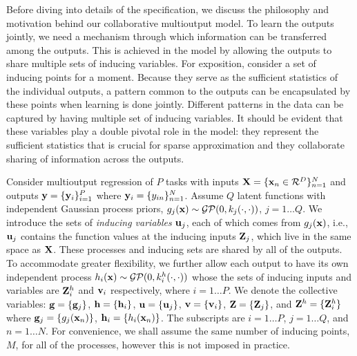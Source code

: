 Before diving into details of the specification, we discuss the philosophy and motivation behind our collaborative multioutput model.
To learn the outputs jointly, we need a mechanism through which information can be transferred among the outputs.
This is achieved in the model by allowing the outputs to share multiple sets of inducing variables.
For exposition, consider a set of inducing points for a moment.
Because they serve as the sufficient statistics of the individual outputs, a pattern common to the outputs can be encapsulated by these points when learning is done jointly. 
Different patterns in the data can be captured by having  multiple set of inducing variables.
It should be evident that these variables play a double pivotal role in the model: they represent the sufficient statistics that is crucial for sparse approximation and they collaborate sharing of information across the outputs.

\newcommand{\Zj}{\Z_j}
\newcommand{\Zhi}{\Z^h_i}
Consider multioutput regression of $P$ tasks with inputs $\mathbf{X} = \{\mathbf{x}_n \in \mathcal{R}^D\}_{n=1}^N$ and outputs $\mathbf{y} = \{\mathbf{y}_i\}_{i=1}^P$ where $\mathbf{y}_i = \{y_{in}\}_{n=1}^N$. 
Assume $Q$ latent functions with independent Gaussian process priors, $g_j(\mathbf{x}) \sim \mathcal{GP}(0, k_j(\cdot,\cdot))$, $j= 1 \hdots Q$.
We introduce the sets of \emph{inducing variables} $\mathbf{u}_j$, each of which comes from $g_j(\mathbf{x})$, i.e., $\mathbf{u}_j$ contains the function values at the inducing inputs $\mathbf{Z}_j$, which live in the same space as $\mathbf{X}$.
These processes and inducing sets are shared by all of the outputs.
To accommodate greater flexibility, we further allow each output to have its own independent process $h_i(\mathbf{x}) \sim \mathcal{GP}(0, k^h_i(\cdot,\cdot))$ whose the sets of inducing inputs and variables are $\mathbf{Z}^h_i$ and $\mathbf{v}_i$ respectively, where $i = 1 \hdots P$.
We denote the collective variables: $\mathbf{g} = \{\mathbf{g}_j\}$, $\mathbf{h} = \{\mathbf{h}_i \}$, $\mathbf{u} = \{\mathbf{u}_j\}$, $\mathbf{v} = \{\mathbf{v}_i\}$, $\Z = \{\Zj\}$, and $\Z^h = \{\Zhi \}$ where $\mathbf{g}_j = \{g_j(\mathbf{x}_n)\}$, $\mathbf{h}_i = \{h_i(\mathbf{x}_n)\}$. 
The subscripts are $i = 1 \hdots P$, $j = 1 \hdots Q$, and $n = 1 \hdots N$.
For convenience, we shall assume the same number of inducing points, $M$, for all of the processes, however this is not imposed in practice.

